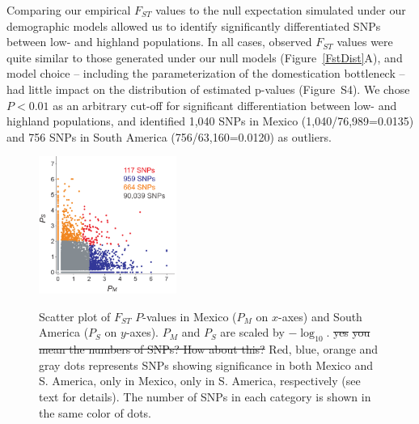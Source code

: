 Comparing our empirical $F_{ST}$ values to the null expectation simulated under our demographic models allowed us to identify significantly differentiated SNPs between low- and highland populations. In all cases, observed $F_{ST}$ values were quite similar to those generated under our null models (Figure~\ref{FstDist}A), and model choice -- including the parameterization of the domestication bottleneck -- had little impact on the distribution of estimated p-values (Figure~S4). We chose $P<0.01$ as an arbitrary cut-off for significant differentiation between low- and highland populations, and identified 1,040 SNPs in Mexico (1,040/76,989=0.0135) and 756 SNPs in South America (756/63,160=0.0120) as outliers.

\begin{figure}[tb]   
  \begin{center}
   \vspace{-0mm}
   \includegraphics[width=0.4\textwidth]{fig/Fig6}
   \renewcommand{\baselinestretch}{0.9}
   \vspace{-3mm}
   \caption{Scatter plot of $F_{ST}$ $P$-values in Mexico ($P_M$ on $x$-axes) and South America ($P_S$ on $y$-axes).  $P_M$ and $P_S$ are scaled by $-\log_{10}$.  
   \st{yes}
   \st{you mean the numbers of SNPs? How about this?}
   Red, blue, orange and gray dots represents SNPs showing significance in both Mexico and S. America, only in Mexico, only in S. America, respectively (see text for details).
   The number of SNPs in each category is shown in the same color of dots.} 
\vspace{-6mm}
    \label{PvDist}
  \end{center}
\end{figure}
%

